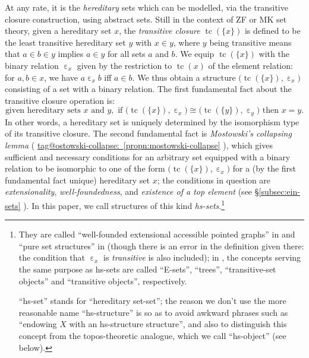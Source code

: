 \documentclass{amsart}
\makeatletter
\newcommand\AND{\text{ and }}
\newcommand\ein{\mathrel{\varepsilon}}
\newcommand\IF{\text{ if }}
\newcommand\pbig[1]{\big({#1}\big)}
\newcommand\set[2][]{#1\{ #2 #1\}}
\newcommand\tc{\operatorname{tc}}
\newcommand\THEN{\text{ then }}
\newcommand\unein{{\ein}}
\newcommand\tagword[1]{\csname tag@#1\endcsname}
\def\label@tag#1:#2\@nil{#1}
\newcommand\labeltag[1]{\label@tag#1:\@nil}
\newcommand\jref[1]{%
  \texorpdfstring%
    {\hyperref[#1]{\tagword{\labeltag{#1}}~\ref*{#1}}}%
    {\tagword{\labeltag{#1}}~\ref*{#1}}%
}
\newcommand\prerefpost[3]{%
  \texorpdfstring%
    {\hyperref[#2]{#1\ref*{#2}#3}}%
    {#1\ref*{#2}#3}%
}
\newcommand\sref[1]{\prerefpost{\S}{#1}{}}
\theoremstyle{definition}
\theoremstyle{remark}
\theoremstyle{plainwithref}
\makeatother
\begin{document}
At any rate, it is the \emph{hereditary} sets which can be modelled, via the transitive closure construction, using abstract sets.
Still in the context of ZF or MK set theory, given a hereditary set \( x \), the \emph{transitive closure} \( \tc(\set{x}) \) is defined to be the least transitive hereditary set \( y \) with \( x \in y \), where \( y \) being transitive means that \( a \in b \in y \) implies \( a \in y \) for all sets \( a \) and \( b \).
We equip \( \tc(\set{x}) \) with the binary relation \( \unein_x \) given by the restriction to \( \tc(x) \) of the element relation: for \( a,b \in x \), we have \( a \ein_x b \) iff \( a \in b \).
We thus obtain a structure \( \pbig{\tc(\set{x}), \unein_x} \) consisting of a set with a binary relation.
The first fundamental fact about the transitive closure operation is:
\[
  \text{given hereditary sets } x \AND y,
  \IF \pbig{\tc(\set{x}), \unein_x} \cong \pbig{\tc(\set{y}), \unein_y}
  \THEN x = y.
\]
In other words, a hereditary set is uniquely determined by the isomorphism type of its transitive closure.
The second fundamental fact is \emph{Mostowski's collapsing lemma} (\jref{propn:mostowski-collapse}), which gives sufficient and necessary conditions for an arbitrary set equipped with a binary relation to be isomorphic to one of the form \( \pbig{\tc(\set{x}), \unein_x} \) for a (by the first fundamental fact unique) hereditary set \( x \); the conditions in question are \emph{extensionality}, \emph{well-foundedness}, and \emph{existence of a top element} (see \sref{subsec:ein-sets}).
In this paper, we call structures of this kind \emph{hs-sets}.\footnote{%
  They are called ``well-founded extensional accessible pointed graphs'' in \cite{aczel-non-well-founded-sets,shulman-comparing} and ``pure set structures'' in \cite{makkai-abstract-sets} (though there is an error in the definition given there: the condition that \( \unein_x \) is \emph{transitive} is also included); in \cite{cole-categories_of_sets,mitchell-boolean-topoi,osius-categorical-set-theory,johnstone-topos-theory}, the concepts serving the same purpose as hs-sets are called ``E-sets'', ``trees'', ``transitive-set objects'' and ``transitive objects'', respectively.

  ``hs-set'' stands for ``hereditary set-set''; the reason we don't use the more reasonable name ``hs-structure'' is so as to avoid awkward phrases such as ``endowing \( X \) with an hs-structure structure'', and also to distinguish this concept from the topos-theoretic analogue, which we call ``hs-object'' (see below).
}
\end{document}

